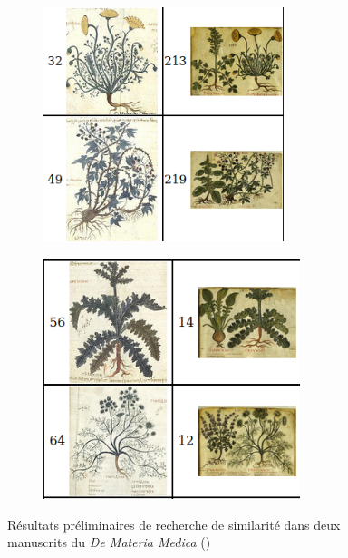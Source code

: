\begin{figure}[h]
	\hspace{1pt}
	\begin{subfigure}{0.5\linewidth}
		\centering
		\includegraphics[width=7cm]{images/vhs_similarity.png}
	\end{subfigure}
	\hspace{1pt}
	\begin{subfigure}{0.5\linewidth}
		\centering
		\includegraphics[width=7.5cm]{images/vhs_similarity2.png}
	\end{subfigure}
	\caption{Résultats préliminaires de recherche de similarité dans deux manuscrits du \textit{De Materia Medica} (\vhs)}
	\label{fig:vhs_similarity}
\end{figure}


